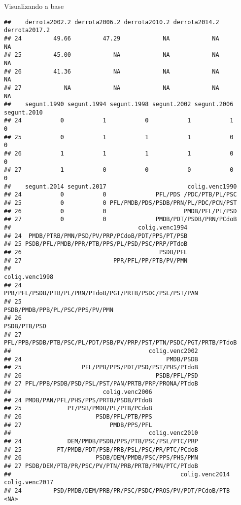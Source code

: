 \documentclass[
  10pt,
  ignorenonframetext,
]{beamer}
\begin{document}
\begin{frame}[fragile]{Visualizando a base}
\begin{verbatim}
##    derrota2002.2 derrota2006.2 derrota2010.2 derrota2014.2 derrota2017.2
## 24         49.66         47.29            NA            NA            NA
## 25         45.00            NA            NA            NA            NA
## 26         41.36            NA            NA            NA            NA
## 27            NA            NA            NA            NA            NA
##    segunt.1990 segunt.1994 segunt.1998 segunt.2002 segunt.2006 segunt.2010
## 24           0           1           0           1           1           0
## 25           0           1           1           1           0           0
## 26           1           1           1           1           0           0
## 27           1           0           0           0           0           0
##    segunt.2014 segunt.2017                       colig.venc1990
## 24           0           0              PFL/PDS /PDC/PTB/PL/PSC
## 25           0           0 PFL/PMDB/PDS/PSDB/PRN/PL/PDC/PCN/PST
## 26           0           0                      PMDB/PFL/PL/PSD
## 27           0           0              PMDB/PDT/PSDB/PRN/PCdoB
##                                    colig.venc1994
## 24  PMDB/PTRB/PMN/PSD/PV/PRP/PCdoB/PDT/PPS/PT/PSB
## 25 PSDB/PFL/PMDB/PPR/PTB/PPS/PL/PSD/PSC/PRP/PTdoB
## 26                                       PSDB/PFL
## 27                          PPR/PFL/PP/PTB/PV/PMN
##                                                        colig.venc1998
## 24            PPB/PFL/PSDB/PTB/PL/PRN/PTdoB/PGT/PRTB/PSDC/PSL/PST/PAN
## 25                                    PSDB/PMDB/PPB/PL/PSC/PPS/PV/PMN
## 26                                                       PSDB/PTB/PSD
## 27 PFL/PPB/PSDB/PTB/PSC/PL/PDT/PSB/PV/PRP/PST/PTN/PSDC/PGT/PRTB/PTdoB
##                                       colig.venc2002
## 24                                         PMDB/PSDB
## 25                 PFL/PPB/PPS/PDT/PSD/PST/PHS/PTdoB
## 26                                      PSDB/PFL/PSD
## 27 PFL/PPB/PSDB/PSD/PSL/PST/PAN/PRTB/PRP/PRONA/PTdoB
##                          colig.venc2006
## 24 PMDB/PAN/PFL/PHS/PPS/PRTB/PSDB/PTdoB
## 25             PT/PSB/PMDB/PL/PTB/PCdoB
## 26                     PSDB/PFL/PTB/PPS
## 27                         PMDB/PPS/PFL
##                                       colig.venc2010
## 24             DEM/PMDB/PSDB/PPS/PTB/PSC/PSL/PTC/PRP
## 25          PT/PMDB/PDT/PSB/PRB/PSL/PSC/PR/PTC/PCdoB
## 26                     PSDB/DEM/PMDB/PSC/PPS/PHS/PMN
## 27 PSDB/DEM/PTB/PR/PSC/PV/PTN/PRB/PRTB/PMN/PTC/PTdoB
##                                                colig.venc2014 colig.venc2017
## 24         PSD/PMDB/DEM/PRB/PR/PSC/PSDC/PROS/PV/PDT/PCdoB/PTB           <NA>

\end{verbatim}
\end{frame}
\end{document}
